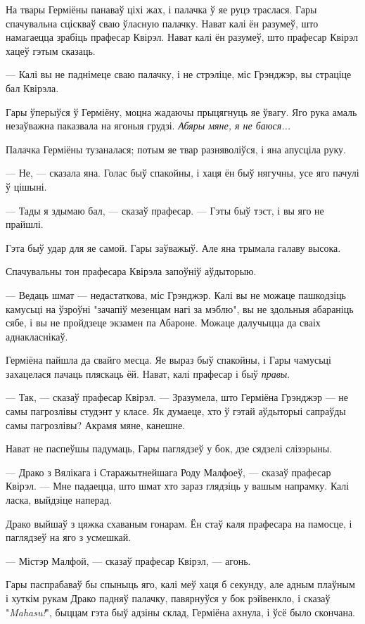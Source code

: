 На твары Герміёны панаваў ціхі жах, і палачка ў яе руцэ траслася. Гары 
спачувальна сціскваў сваю ўласную палачку. Нават калі ён разумеў, што 
намагаецца зрабіць прафесар Квірэл. Нават калі ён разумеў, што прафесар 
Квірэл хацеў гэтым сказаць.

--- Калі вы не паднімеце сваю палачку, і не стрэліце, міс Грэнджэр, вы 
страціце бал Квірэла.

Гары ўперыўся ў Герміёну, моцна жадаючы прыцягнуць яе ўвагу. Яго рука амаль незаўважна
паказвала на ягоныя грудзі.   \emph{Абяры мяне, я не баюся...}

Палачка Герміёны тузаналася; потым яе твар разняволіўся, і яна апусціла 
руку.

--- Не, --- сказала яна. Голас быў спакойны, і хаця ён быў нягучны, усе яго пачулі 
ў цішыні.

--- Тады я здымаю бал, --- сказаў прафесар. --- Гэты быў тэст, і вы яго не прайшлі.

Гэта быў удар для яе самой. Гары заўважыў. Але яна трымала галаву высока.

Спачувальны тон прафесара Квірэла запоўніў аўдыторыю.

--- Ведаць шмат --- недастаткова, міс Грэнджэр. Калі вы не можаце пашкодзіць 
камусьці на ўзроўні "зачапіў мезенцам нагі за мэблю", вы не здольныя абараніць 
сябе, і вы не пройдзеце экзамен па Абароне. Можаце далучыцца да сваіх 
аднакласнікаў.

Герміёна пайшла да свайго месца. Яе выраз быў спакойны, і Гары чамусьці 
захацелася пачаць пляскаць ёй. Нават, калі прафесар і быў \emph{правы}.

--- Так, --- сказаў прафесар Квірэл. --- Зразумела, што Герміёна Грэнджэр ---
не самы пагрозлівы студэнт у класе. Як думаеце, хто ў гэтай аўдыторыі
сапраўды самы пагрозлівы? Акрамя мяне, канешне.

Нават не паспеўшы падумаць, Гары паглядзеў у бок, дзе сядзелі слізэрыны.

--- Драко з Вялікага і Старажытнейшага Роду Малфоеў, --- сказаў прафесар Квірэл.
--- Мне падаецца, што шмат хто зараз глядзіць у вашым напрамку. Калі ласка, 
выйдзіце наперад.

Драко выйшаў з цяжка схаваным гонарам. Ён стаў каля прафесара на памосце,
і паглядзеў на яго з усмешкай.

--- Містэр Малфой, --- сказаў прафесар Квірэл, --- агонь.

Гары паспрабаваў бы спыныць яго, калі меў хаця б секунду, але адным 
плаўным і хуткім рукам Драко падняў палачку, павярнуўся у бок рэйвенкло, 
і сказаў "\emph{Mahasu!}", быццам гэта быў адзіны склад, Герміёна ахнула, 
і ўсё было скончана.

